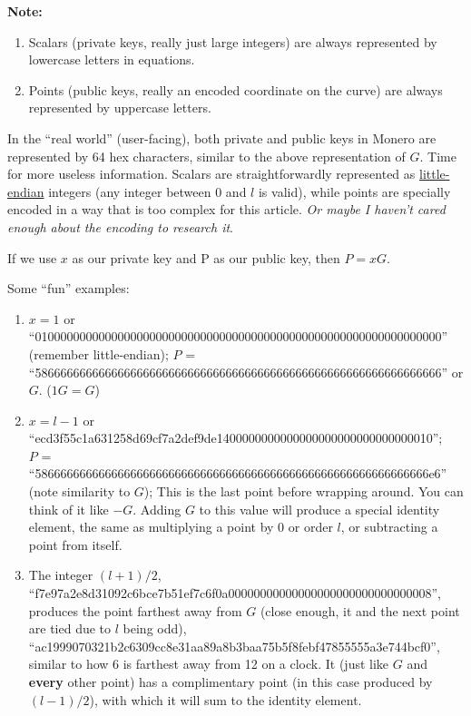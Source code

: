 \textbf{Note:}
	\begin{enumerate}
		\item Scalars (private keys, really just large integers) are always represented by lowercase letters in equations.
		\item Points (public keys, really an encoded coordinate on the curve) are always represented by uppercase letters.
	\end{enumerate}
	In the ``real world'' (user-facing), both private and public keys in Monero are represented by 64 hex characters, similar to the above representation of \(G\). Time for more useless information. Scalars are straightforwardly represented as \href{https://en.wikipedia.org/wiki/Endianness#Little}{little-endian} integers (any integer between 0 and \(l\) is valid), while points are specially encoded in a way that is too complex for this article. \emph{Or maybe I haven't cared enough about the encoding to research it}.

	If we use \(x\) as our private key and P as our public key, then \(P = xG\).

Some ``fun'' examples:
	\begin{enumerate}
		\item \(x = 1\) or ``0100000000000000000000000000000000000000000000000000000000000000'' (remember little-endian); \(P\) = ``5866666666666666666666666666666666666666666666666666666666666666'' or \(G\). (\(1G = G\))
		\item \(x = l - 1\) or ``ecd3f55c1a631258d69cf7a2def9de1400000000000000000000000000000010''; \\\(P\) = ``58666666666666666666666666666666666666666666666666666666666666e6'' (note similarity to \(G\)); This is the last point before wrapping around. You can think of it like \(-G\). Adding \(G\) to this value will produce a special identity element, the same as multiplying a point by 0 or order \(l\), or subtracting a point from itself.
		\item The integer  \((l+1) / 2\), ``f7e97a2e8d31092c6bce7b51ef7c6f0a00000000000000000000000000000008'', produces the point farthest away from \(G\) (close enough, it and the next point are tied due to \(l\) being odd), ``ac1999070321b2c6309cc8e31aa89a8b3baa75b5f8febf47855555a3e744bcf0'', similar to how 6 is farthest away from 12 on a clock. It (just like \(G\) and \textbf{every} other point) has a complimentary point (in this case produced by \((l-1) / 2\)), with which it will sum to the identity element.
	\end{enumerate}
